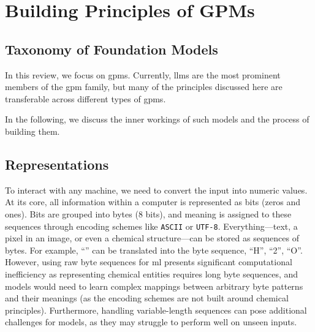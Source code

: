 \section{Building Principles of GPMs}

\subsection{Taxonomy of Foundation Models}
\label{sec:taxonomy}

In this review, we focus on \glspl{gpm}.
Currently, \glspl{llm} are the most prominent members of the \gls{gpm} family, but many of the principles discussed here are transferable across different types of \glspl{gpm}.

In the following, we discuss the inner workings of such models and the process of building them.

\subsection{Representations}
To interact with any machine, we need to convert the input into numeric values. 
At its core, all information within a computer is represented as bits (zeros and ones). 
Bits are grouped into bytes (8 bits), and meaning is assigned to these sequences through encoding schemes like \texttt{ASCII} or \texttt{UTF-8}. 
Everything---text, a pixel in an image, or even a chemical structure---can be stored as sequences of bytes. 
For example, \enquote{} can be translated into the byte sequence, \enquote{H}, \enquote{2}, \enquote{O}. 
However, using raw byte sequences for \gls{ml} presents significant computational inefficiency as representing chemical entities requires long byte sequences, and models would need to learn complex mappings between arbitrary byte patterns and their meanings (as the encoding schemes are not built around chemical principles). 
Furthermore, handling variable-length sequences can pose additional challenges for models, as they may struggle to perform well on unseen inputs. \autocite{zhou2023algorithms,baillargeon2022assessing} 

